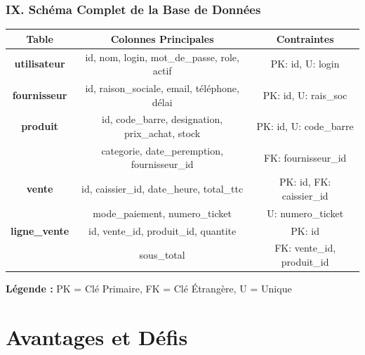 \documentclass[11pt, aspectratio=169]{beamer}
\begin{document}
\begin{frame}
    \frametitle{IX. Schéma Complet de la Base de Données}
    
    \begin{center}
        \small
        \begin{tabular}{|c|c|c|}
            \hline
            \rowcolor{LightBlue}
            \textbf{Table} & \textbf{Colonnes Principales} & \textbf{Contraintes} \\
            \hline
            \hline
            \textbf{utilisateur} & id, nom, login, mot\_de\_passe, role, actif & PK: id, U: login \\
            \hline
            \textbf{fournisseur} & id, raison\_sociale, email, téléphone, délai & PK: id, U: rais\_soc \\
            \hline
            \textbf{produit} & id, code\_barre, designation, prix\_achat, stock & PK: id, U: code\_barre \\
            & categorie, date\_peremption, fournisseur\_id & FK: fournisseur\_id \\
            \hline
            \textbf{vente} & id, caissier\_id, date\_heure, total\_ttc & PK: id, FK: caissier\_id \\
            & mode\_paiement, numero\_ticket & U: numero\_ticket \\
            \hline
            \textbf{ligne\_vente} & id, vente\_id, produit\_id, quantite & PK: id \\
            & sous\_total & FK: vente\_id, produit\_id \\
            \hline
        \end{tabular}
    \end{center}
    
    \vspace{0.8cm}
    \begin{small}
        \textbf{Légende :} PK = Clé Primaire, FK = Clé Étrangère, U = Unique
    \end{small}
\end{frame}


\section{Avantages et Défis}
\end{document}
